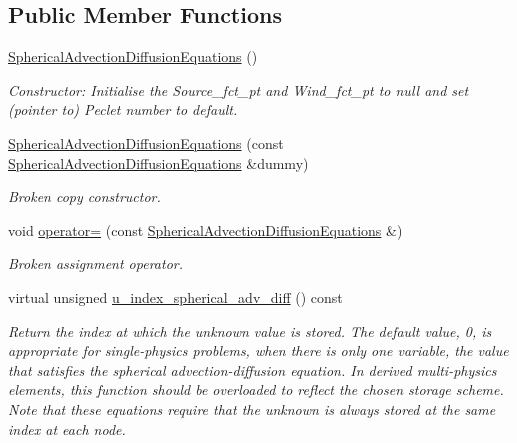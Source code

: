 \subsection*{Public Member Functions}
\begin{DoxyCompactItemize}
\item 
\hyperlink{classoomph_1_1SphericalAdvectionDiffusionEquations_aed5cfed74d16b43e5a9ca081b845b2a2}{Spherical\+Advection\+Diffusion\+Equations} ()
\begin{DoxyCompactList}\small\item\em Constructor\+: Initialise the Source\+\_\+fct\+\_\+pt and Wind\+\_\+fct\+\_\+pt to null and set (pointer to) Peclet number to default. \end{DoxyCompactList}\item 
\hyperlink{classoomph_1_1SphericalAdvectionDiffusionEquations_a3ef8f55c02bf521af9da3cae9eb2a689}{Spherical\+Advection\+Diffusion\+Equations} (const \hyperlink{classoomph_1_1SphericalAdvectionDiffusionEquations}{Spherical\+Advection\+Diffusion\+Equations} \&dummy)
\begin{DoxyCompactList}\small\item\em Broken copy constructor. \end{DoxyCompactList}\item 
void \hyperlink{classoomph_1_1SphericalAdvectionDiffusionEquations_ac1df4b72634538673bfd5c1eab02ddad}{operator=} (const \hyperlink{classoomph_1_1SphericalAdvectionDiffusionEquations}{Spherical\+Advection\+Diffusion\+Equations} \&)
\begin{DoxyCompactList}\small\item\em Broken assignment operator. \end{DoxyCompactList}\item 
virtual unsigned \hyperlink{classoomph_1_1SphericalAdvectionDiffusionEquations_a9a2928db14dc07aa3af1ee2dd7901dc5}{u\+\_\+index\+\_\+spherical\+\_\+adv\+\_\+diff} () const
\begin{DoxyCompactList}\small\item\em Return the index at which the unknown value is stored. The default value, 0, is appropriate for single-\/physics problems, when there is only one variable, the value that satisfies the spherical advection-\/diffusion equation. In derived multi-\/physics elements, this function should be overloaded to reflect the chosen storage scheme. Note that these equations require that the unknown is always stored at the same index at each node. \end{DoxyCompactList}\item 

\end{DoxyCompactItemize}
